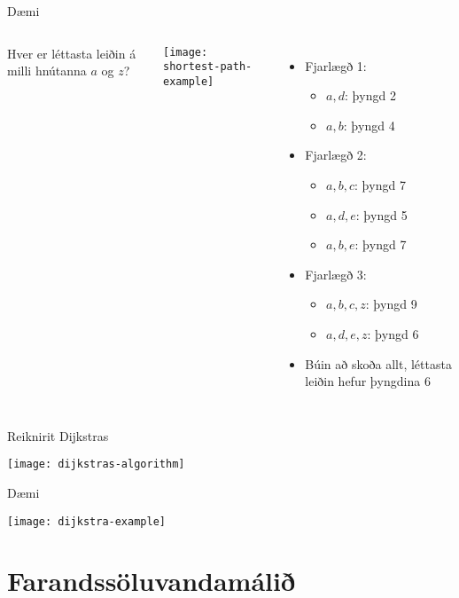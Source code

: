 \documentclass[handout]{beamer}
\begin{document}
\begin{frame}{Dæmi}
\begin{columns}
Hver er léttasta leiðin á milli hnútanna $a$ og $z$?
\begin{center}
\texttt{[image: shortest-path-example]}
\end{center}
\begin{itemize}
 \item Fjarlægð 1:
 \begin{itemize}
  \item $a, d$: þyngd 2
  \item $a, b$: þyngd 4
 \end{itemize} \pause
 \item Fjarlægð 2:
 \begin{itemize}
  \item $a, b, c$: þyngd 7
  \item $a, d, e$: þyngd 5
  \item $a, b, e$: þyngd 7
 \end{itemize} \pause
 \item Fjarlægð 3:
 \begin{itemize}
  \item $a, b, c, z$: þyngd 9
  \item $a, d, e, z$: þyngd 6
 \end{itemize}
 \item Búin að skoða allt, léttasta leiðin hefur þyngdina 6
\end{itemize}
\end{columns}
\end{frame}

\begin{frame}{Reiknirit Dijkstras}
\begin{center}
\texttt{[image: dijkstras-algorithm]}
\end{center}
\end{frame}

\begin{frame}{Dæmi}
\begin{center}
\texttt{[image: dijkstra-example]}
\end{center}
\end{frame}

\section{Farandssöluvandamálið}
\end{document}

